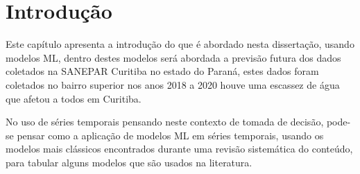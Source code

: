 

\section{Introdu{\c c}{\~a}o} \label{sec:int}

Este capítulo apresenta a introdução do que é abordado nesta dissertação, usando modelos ML, dentro destes modelos será abordada a previsão futura dos dados coletados na SANEPAR Curitiba no estado do Paraná, estes dados foram coletados no bairro superior nos anos 2018 a 2020 houve uma escassez de água que afetou a todos em Curitiba.

No uso de séries temporais pensando neste contexto de tomada de decisão, pode-se pensar como a aplicação de modelos ML em séries temporais, usando os modelos mais clássicos encontrados durante uma revisão sistemática do conteúdo, para tabular alguns modelos que são usados na literatura.  




    
          
    
    
    
    
    
    
    
    